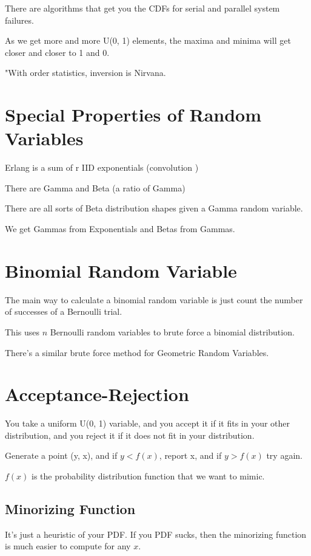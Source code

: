 \documentclass[fleqn]{report}
\begin{document}

There are algorithms that get you the CDFs for serial and parallel system failures.

As we get more and more U(0, 1) elements, the maxima and minima will get closer 
and closer to 1 and 0. 

"With order statistics, inversion is Nirvana. 

\section{Special Properties of Random Variables}
Erlang is a sum of r IID exponentials (convolution )

There are Gamma and Beta (a ratio of Gamma)

There are all sorts of Beta distribution shapes given a Gamma random variable. 

We get Gammas from Exponentials and Betas from Gammas. 

\section{Binomial Random Variable}

The main way to calculate a binomial random variable is just count the number 
of successes of a Bernoulli trial. 

This uses $n$ Bernoulli random variables to brute force a binomial distribution. 

There's a similar brute force method for Geometric Random Variables. 

\section{Acceptance-Rejection}
You take a uniform U(0, 1) variable, and you accept it if it fits in your 
other distribution, and you reject it if it does not fit in your distribution. 

Generate a point (y, x), and if $y < f(x)$, report x, and if $y > f(x)$ try again. 

$f(x)$ is the probability distribution function that we want to mimic. 

\subsection{Minorizing Function}
It's just a heuristic of your PDF. If you PDF sucks, then the minorizing function 
is much easier to compute for any $x$. 
\end{document}
